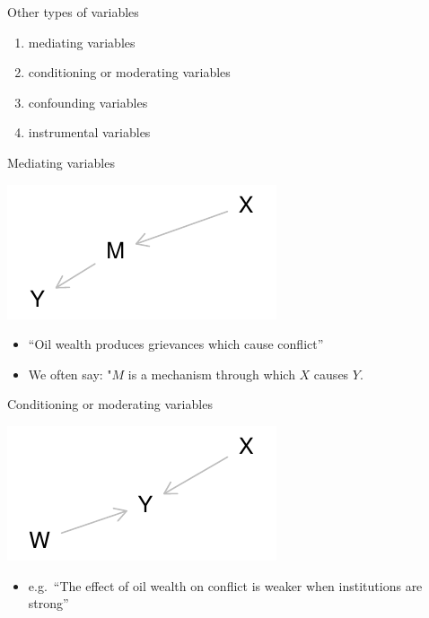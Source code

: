 \documentclass[
  11pt,
  ignorenonframetext,
]{beamer}
\providecommand{\tightlist}{%
  \setlength{\itemsep}{0pt}\setlength{\parskip}{0pt}}
\begin{document}
\begin{frame}{Other types of variables}
\protect\hypertarget{other-types-of-variables}{}
\begin{enumerate}
\tightlist
\item
  mediating variables
\item
  conditioning or moderating variables
\item
  confounding variables
\item
  instrumental variables
\end{enumerate}
\end{frame}

\begin{frame}{Mediating variables}
\protect\hypertarget{mediating-variables}{}
\begin{center}\includegraphics[height=0.5\textheight]{_nodes_and_claims_files/figure-beamer/unnamed-chunk-3-1} \end{center}

\begin{itemize}
\item
  ``Oil wealth produces grievances which cause conflict''
\item
  We often say: "\(M\) is a mechanism through which \(X\) causes \(Y\).
\end{itemize}
\end{frame}

\begin{frame}{Conditioning or moderating variables}
\protect\hypertarget{conditioning-or-moderating-variables}{}
\begin{center}\includegraphics[height=0.5\textheight]{_nodes_and_claims_files/figure-beamer/unnamed-chunk-4-1} \end{center}

\begin{itemize}
\tightlist
\item
  e.g.~``The effect of oil wealth on conflict is weaker when
  institutions are strong''
\end{itemize}
\end{frame}
\end{document}
